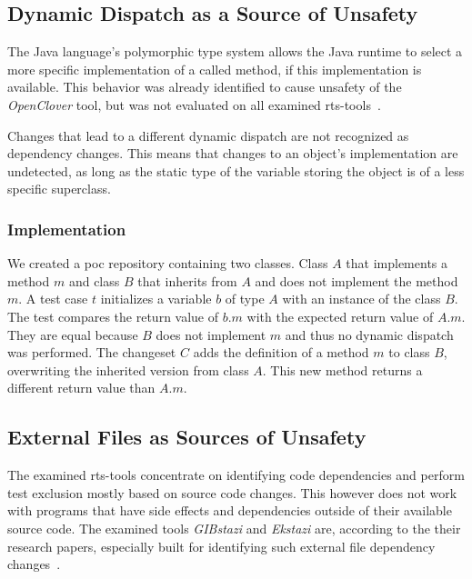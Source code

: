 \subsection{Dynamic Dispatch as a Source of Unsafety}

The Java language's polymorphic type system allows the Java runtime to select a more specific
implementation of a called method, if this implementation is available. This behavior was already
identified to cause unsafety of the \emph{OpenClover} tool, but was not evaluated on all examined \ac{rts}-tools~\cite{unsafety_eval}.

\begin{hypothesis}\label{hyp:dyn_dis}
    Changes that lead to a different dynamic dispatch are not recognized as dependency
    changes. This means that changes to an object's implementation are undetected, as long as the static type of
    the variable storing the object is of a less specific superclass.
\end{hypothesis}

\subsubsection{Implementation }
We created a \ac{poc} repository containing two classes. Class $A$ that implements a method $m$ and
class $B$ that inherits from $A$ and does not implement the method $m$. A test case $t$ initializes
a variable $b$ of type $A$ with an instance of the class $B$. The test compares the return value of $b.m$
with the expected return value of $A.m$. They are equal because $B$ does not implement $m$ and thus
no dynamic dispatch was performed. The
changeset $C$ adds the definition of a method $m$ to class $B$, overwriting the inherited version
from class $A$. This new method returns a different return value than $A.m$.

\subsection{External Files as Sources of Unsafety}\label{ssec:external_files}

The examined \ac{rts}-tools concentrate on identifying code dependencies and perform test exclusion
mostly based on source code changes. This however does not work with programs that have side effects and
dependencies outside of their available source code. The examined tools \emph{GIBstazi} and \emph{Ekstazi} are,
according to the their research papers, especially built for identifying such external file
dependency changes~\cite{ekstazimain,gibstazi_paper}.


